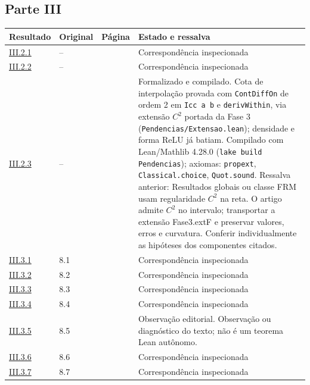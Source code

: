 \documentclass[12pt,a4paper]{article}
\theoremstyle{preciso}
\theoremstyle{definition}
\theoremstyle{preciso}
\theoremstyle{preciso}
\theoremstyle{preciso}
\theoremstyle{preciso}
\theoremstyle{definition}
\theoremstyle{preciso}
\theoremstyle{definition}
\theoremstyle{preciso}
\theoremstyle{preciso}
\theoremstyle{definition}
\begin{document}
\begin{singlespace}
\subsection*{Parte III}
\small
\begin{longtable}{@{}p{.11\linewidth}p{.09\linewidth}p{.09\linewidth}p{.59\linewidth}@{}}
\toprule Resultado & Original & Página & Estado e ressalva\\\midrule\endhead
\hyperref[map:artigo_2:2.1]{III.2.1} & -- & \pageref{map:artigo_2:2.1} & Correspondência inspecionada\\[4pt]
\hyperref[map:artigo_2:2.2]{III.2.2} & -- & \pageref{map:artigo_2:2.2} & Correspondência inspecionada\\[4pt]
\hyperref[map:artigo_2:2.3]{III.2.3} & -- & \pageref{map:artigo_2:2.3} & Formalizado e compilado. Cota de interpolação provada com \texttt{ContDiffOn} de ordem 2 em \texttt{Icc a b} e \texttt{derivWithin}, via extensão $C^2$ portada da Fase 3 (\texttt{Pendencias/Extensao.lean}); densidade e forma ReLU já batiam. Compilado com Lean/Mathlib 4.28.0 (\texttt{lake build Pendencias}); axiomas: \texttt{propext}, \texttt{Classical.choice}, \texttt{Quot.sound}. Ressalva anterior: Resultados globais ou classe FRM usam regularidade $C^2$ na reta. O artigo admite $C^2$ no intervalo; transportar a extensão Fase3.extF e preservar valores, erros e curvatura. Conferir individualmente as hipóteses dos componentes citados.\\[4pt]
\hyperref[map:artigo_2:3.1]{III.3.1} & 8.1 & \pageref{map:artigo_2:3.1} & Correspondência inspecionada\\[4pt]
\hyperref[map:artigo_2:3.2]{III.3.2} & 8.2 & \pageref{map:artigo_2:3.2} & Correspondência inspecionada\\[4pt]
\hyperref[map:artigo_2:3.3]{III.3.3} & 8.3 & \pageref{map:artigo_2:3.3} & Correspondência inspecionada\\[4pt]
\hyperref[map:artigo_2:3.4]{III.3.4} & 8.4 & \pageref{map:artigo_2:3.4} & Correspondência inspecionada\\[4pt]
\hyperref[map:artigo_2:3.5]{III.3.5} & 8.5 & \pageref{map:artigo_2:3.5} & Observação editorial. Observação ou diagnóstico do texto; não é um teorema Lean autônomo.\\[4pt]
\hyperref[map:artigo_2:3.6]{III.3.6} & 8.6 & \pageref{map:artigo_2:3.6} & Correspondência inspecionada\\[4pt]
\hyperref[map:artigo_2:3.7]{III.3.7} & 8.7 & \pageref{map:artigo_2:3.7} & Correspondência inspecionada\\[4pt]

\end{longtable}
\end{singlespace}
\end{document}
